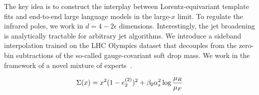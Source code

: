 The key idea is to construct the interplay between Lorentz-equivariant
template fits and end-to-end large language models in the large-$x$
limit. To regulate the infrared poles, we work in $d = 4 - 2\epsilon$
dimensions. Interestingly, the jet broadening is analytically tractable
for arbitrary jet algorithms. We introduce a sideband interpolation
trained on the LHC Olympics dataset that decouples from the zero-bin
subtractions of the so-called gauge-covariant soft drop mass. We work in
the framework of a novel mixture of
experts~\cite{TPC:2310-Precision-Attention-Weights-at-the-LHC-October-4-2026}.

\begin{equation}
  \Sigma(x) = {x}^{2} (1 - e_2^{(2)})^{2} + \beta_0 \alpha_s^2 \log\frac{\mu_R}{\mu_F}
  \label{eq:4}
\end{equation}

